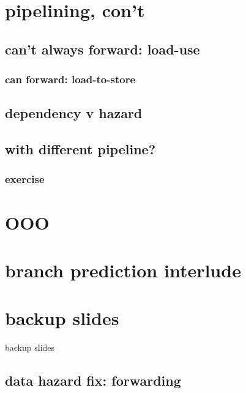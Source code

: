 \section{pipelining, con't}

\subsection{can't always forward: load-use}


\subsubsection{can forward: load-to-store}






\subsection{dependency v hazard}




\subsection{with different pipeline?}


\subsubsection{exercise}


\section{OOO}


\section{branch prediction interlude}


\section{backup slides}
\begin{frame}{backup slides}
\end{frame}

\subsection{data hazard fix: forwarding}





